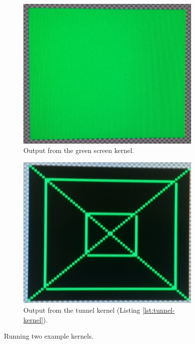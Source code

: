 \documentclass[../main/report.tex]{subfiles}
\begin{document}
\begin{figure}[H]
	\centering
	\begin{subfigure}[t]{0.45\textwidth}
		\centering
		\includegraphics[width=\textwidth]{../results/diagrams/green_screen_run.jpg}
		\caption{Output from the green screen kernel.}
	\end{subfigure} 
	\begin{subfigure}[t]{0.45\textwidth}
		\centering
		\includegraphics[width=\textwidth]{../results/diagrams/kernel_run_tunnel.jpg}	
		\caption{Output from the tunnel kernel (Listing \ref{lst:tunnel-kernel}).}
	\end{subfigure}
	\caption{Running two example kernels.}
	\label{fig:kernel_outputs}

\end{figure}
\end{document}
